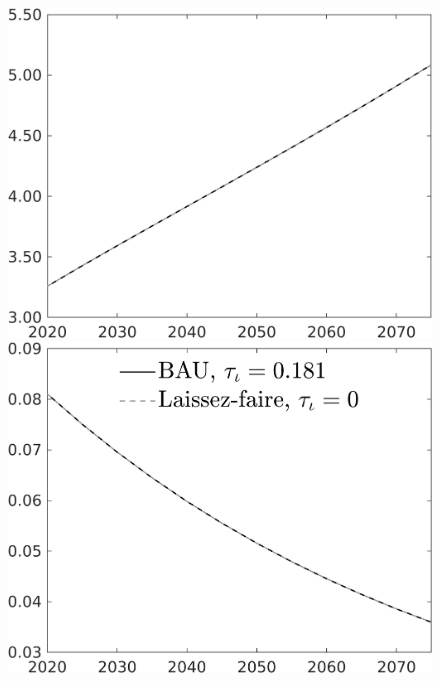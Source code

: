 \documentclass[12pt]{article}
\begin{document}
\begin{figure}[h!!]
\begin{minipage}[]{0.32\textwidth}
	\end{minipage}	
	\begin{minipage}[]{0.32\textwidth}
		\includegraphics[width=1\textwidth]{../../codding_model/own_basedOnFried/optimalPol_010922_revision/figures/all_13Sept22/CompTaul_Equlab_LFBAU_Reg0_wh_spillover0_nsk1_xgr0_knspil1_sep1_countec0_GovRev0_etaa0.79_lgd0.png}
	\end{minipage}	
	\begin{minipage}[]{0.32\textwidth}
		\includegraphics[width=1\textwidth]{../../codding_model/own_basedOnFried/optimalPol_010922_revision/figures/all_13Sept22/CompTaul_Equlab_LFBAU_Reg0_GFF_spillover0_nsk1_xgr0_knspil1_sep1_countec0_GovRev0_etaa0.79_lgd1.png}

\end{minipage}
\end{figure}
\end{document}
